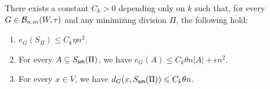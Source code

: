 \begin{lemma}\label{lemma:SubCompareSparseSideEdgesK1k}
There exists a constant $C_k>0$ depending only on $k$ such that, for every $G\in{\mathcal B}_{n,m}(W,\tau)$ and any minimizing division $\Pi$, the following hold:
\begin{enumerate}[label=\textit{(\roman*)}, ref=(\textit{\roman*}), topsep=5pt]
  \item\label{item:SubCompareSparseSideEdgesK1k-total} $e_G(S_\Pi)\leq C_k\eta n^2$.
  \item\label{item:SubCompareSparseSideEdgesK1k-small} For every $A\subseteq S_{\mathsf{sm}}(\Pi)$, we have $e_G(A)\leq C_k\theta n|A|+\epsilon n^2$.
  \item\label{item:SubCompareSparseSideEdgesK1k-row} For every $x\in V$, we have $d_G(x,S_{\mathsf{sm}}(\Pi))\leqslant C_k\theta n$.
\end{enumerate}
\end{lemma}

